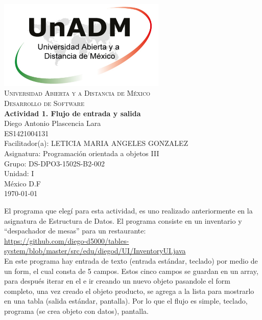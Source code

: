 \documentclass[spanish,12pt,letterpapper]{article}
\begin{document}
	\begin{titlepage}
		\begin{center}
			\includegraphics[width=0.6\textwidth]{../logoUnADM}~\\[1cm] 
			\textsc{Universidad Abierta y a Distancia de México}\\[0.8cm]
			\textsc{Desarrollo de Software}\\[1.8cm]
			
			\textbf{ \Large Actividad 1. Flujo de entrada y salida}\\[3cm]
			
			Diego Antonio Plascencia Lara\\ ES1421004131 \\[0.4cm]
			Facilitador(a): LETICIA MARIA ANGELES GONZALEZ\\
			Asignatura: Programación orientada a objetos III\\
			Grupo: DS-DPO3-1502S-B2-002 \\
			Unidad: I \\
			
			\vfill México D.F\\{\today}
			
		\end{center}
	\end{titlepage}
	
	El programa que elegí para esta actividad, es uno realizado anteriormente en la asignatura de Estructura de Datos. El programa consiste en un inventario y ``despachador de mesas'' para un restaurante: \\
	
	\url{https://github.com/diego-d5000/tables-system/blob/master/src/edu/diegod/UI/InventoryUI.java} \\
	
	En este programa hay entrada de texto (entrada estándar, teclado) por medio de un form, el cual consta de 5 campos. Estos cinco campos se guardan en un array, para después iterar en el e ir creando un nuevo objeto pasandole el form completo, una vez creado el objeto producto, se agrega a la lista para mostrarlo en una tabla (salida estándar, pantalla). Por lo que el flujo es simple, teclado, programa (se crea objeto con datos), pantalla.\\
	
	
\end{document}
